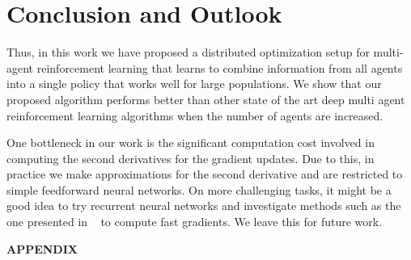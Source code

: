 \documentclass{article}
\begin{document}
\section{Conclusion and Outlook}
Thus, in this work we have proposed a distributed optimization setup for multi-agent reinforcement learning that learns to combine information from all agents into a single policy that works well for large populations. We show that our proposed algorithm performs better than other state of the art deep multi agent reinforcement learning algorithms when the number of agents are increased.

One bottleneck in our work is the significant computation cost involved in computing the second derivatives for the gradient updates. Due to this, in practice we make approximations for the second derivative and are restricted to simple feedforward neural networks. On more challenging tasks, it might be a good idea to try recurrent neural networks and investigate methods such as the one presented in ~\cite{martens2018kroneckerfactored} to compute fast gradients. We leave this for future work.
\clearpage
\small


\clearpage
\appendix
\textbf{APPENDIX} 
\end{document}
